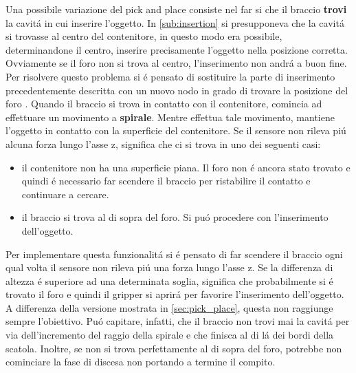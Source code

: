 Una possibile variazione del pick and place consiste nel far si che il braccio \textbf{trovi} la cavit\'{a} in cui inserire l'oggetto. 
In \ref{sub:insertion} si presupponeva che la cavit\'{a} si trovasse al centro del contenitore, in questo modo era possibile, 
determinandone il centro, inserire precisamente l'oggetto nella posizione corretta. Ovviamente se il foro non si trova al centro, 
l'inserimento non andr\'{a} a buon fine. Per risolvere questo problema si \'{e} pensato di sostituire la parte di inserimento 
precedentemente descritta con un nuovo nodo in grado di trovare la posizione del foro \cite{spiral}. 
Quando il braccio si trova in contatto con il contenitore, comincia ad effettuare un movimento a \textbf{spirale}. 
Mentre effettua tale movimento, mantiene l'oggetto in contatto con la superficie del contenitore. Se il sensore 
non rileva pi\'{u} alcuna forza lungo l'asse z, significa che ci si trova in uno dei seguenti casi:
\begin{itemize}
    \item il contenitore non ha una superficie piana. Il foro non \'{e} ancora stato trovato e quindi \'{e} necessario far scendere 
    il braccio per ristabilire il contatto e continuare a cercare.
    \item il braccio si trova al di sopra del foro. Si pu\'{o} procedere con l'inserimento dell'oggetto.
\end{itemize} 
Per implementare questa funzionalit\'{a} si \'{e} pensato di far scendere il braccio ogni qual volta il sensore non rileva pi\'{u}
una forza lungo l'asse z. Se la differenza di altezza \'{e} superiore ad una determinata soglia, significa che probabilmente si \'{e} 
trovato il foro e quindi il gripper si aprir\'{a} per favorire l'inserimento dell'oggetto. 
A differenza della versione mostrata in \ref{sec:pick_place}, questa non raggiunge sempre l'obiettivo. 
Pu\'{o} capitare, infatti, che il braccio non trovi mai la cavit\'{a} per via dell'incremento del raggio della spirale e che finisca 
al di l\'{a} dei bordi della scatola. Inoltre, se non si trova perfettamente al di sopra del foro, potrebbe non cominciare la 
fase di discesa non portando a termine il compito.
